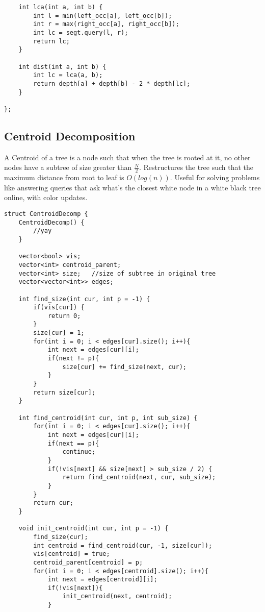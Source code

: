 \documentclass[8pt, headheight=10pt, a4paper]{article}
\begin{document}
\begin{multicols*}{3}
\begin{lstlisting}
    int lca(int a, int b) {
        int l = min(left_occ[a], left_occ[b]);
        int r = max(right_occ[a], right_occ[b]);
        int lc = segt.query(l, r);
        return lc;
    }

    int dist(int a, int b) {
        int lc = lca(a, b);
        return depth[a] + depth[b] - 2 * depth[lc];
    }

};
\end{lstlisting}

\subsection{Centroid Decomposition}
A Centroid of a tree is a node such that when the tree is rooted at it, no other nodes have a subtree of size greater than $\frac{N}{2}$. 
Restructures the tree such that the maximum distance from root to leaf is $O(log(n))$. Useful for solving problems like answering queries that ask what's the closest white node in a white black tree online, with color updates. 
\begin{lstlisting}
struct CentroidDecomp {
    CentroidDecomp() {
        //yay
    }

    vector<bool> vis;
    vector<int> centroid_parent;
    vector<int> size;   //size of subtree in original tree
    vector<vector<int>> edges;

    int find_size(int cur, int p = -1) {
        if(vis[cur]) {
            return 0;
        }
        size[cur] = 1;
        for(int i = 0; i < edges[cur].size(); i++){
            int next = edges[cur][i];
            if(next != p){
                size[cur] += find_size(next, cur);
            }
        }
        return size[cur];
    }

    int find_centroid(int cur, int p, int sub_size) {
        for(int i = 0; i < edges[cur].size(); i++){
            int next = edges[cur][i];
            if(next == p){
                continue;
            }
            if(!vis[next] && size[next] > sub_size / 2) {
                return find_centroid(next, cur, sub_size);
            }
        }
        return cur;
    }

    void init_centroid(int cur, int p = -1) {
        find_size(cur);
        int centroid = find_centroid(cur, -1, size[cur]);
        vis[centroid] = true;
        centroid_parent[centroid] = p;
        for(int i = 0; i < edges[centroid].size(); i++){
            int next = edges[centroid][i];
            if(!vis[next]){
                init_centroid(next, centroid);
            }
            

\end{lstlisting}
\end{multicols*}
\end{document}
